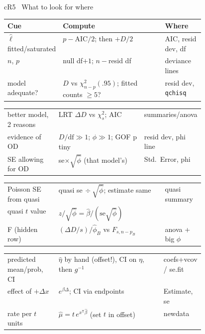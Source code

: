 \documentclass{article}
\newcommand{\tsp}{^{\mathsf T}}
\newcommand{\rc}[1]{\texttt{#1}}
\begin{document}
\begin{multicols*}{3}
\begin{tb}{cR}{5 \textbullet\ What to look for where}
\begin{tabularx}{\linewidth}{@{}>{\raggedright\arraybackslash}p{0.26\linewidth}|L|>{\raggedright\arraybackslash}p{0.2\linewidth}@{}}
\textbf{Cue} & \textbf{Compute} & \textbf{Where}\\\hline
$\hat\ell$ fitted/saturated & $p-\text{AIC}/2$; then $+D/2$ & AIC, resid dev, df\\
$n$, $p$ & null df$+1$; $n-$resid df & deviance lines\\
model adequate? & $D$ vs $\chi^2_{n-p}(.95)$; fitted counts $\ge5$? & resid dev, \rc{qchisq}\\
\end{tabularx}\par\nointerlineskip
\begin{tabularx}{\linewidth}{@{}>{\raggedright\arraybackslash}p{0.26\linewidth}|L|>{\raggedright\arraybackslash}p{0.2\linewidth}@{}}
better model, 2 reasons & LRT $\Delta D$ vs $\chi^2_s$; AIC & 2 summaries/anova\\
evidence of OD & $D/\text{df}\gg1$; $\hat\phi\gg1$; GOF p tiny & resid dev, phi line\\
SE allowing for OD & se$\times\sqrt{\hat\phi}$ (that model's) & Std.\ Error, phi\\
\end{tabularx}\par\nointerlineskip
\begin{tabularx}{\linewidth}{@{}>{\raggedright\arraybackslash}p{0.26\linewidth}|L|>{\raggedright\arraybackslash}p{0.2\linewidth}@{}}
Poisson SE from quasi & quasi se$\,\div\sqrt{\hat\phi}$; estimate same & quasi summary\\
quasi $t$ value & $z/\sqrt{\hat\phi}=\hat\beta/(\text{se}\sqrt{\hat\phi})$ & \\
F (hidden row) & $(\Delta D/s)/\hat\phi_B$ vs $F_{s,n-p_B}$ & anova + big $\hat\phi$\\
\end{tabularx}\par\nointerlineskip
\begin{tabularx}{\linewidth}{@{}>{\raggedright\arraybackslash}p{0.26\linewidth}|L|>{\raggedright\arraybackslash}p{0.2\linewidth}@{}}
predicted mean/prob, CI & $\hat\eta$ by hand (offset!), CI on $\eta$, then $g^{-1}$ & coefs+vcov / se.fit\\
effect of $+\Delta x$ & $e^{\beta\Delta}$; CI via endpoints & Estimate, se\\
rate per $t$ units & $\hat\mu=t\,e^{x\tsp\hat\beta}$ (set $t$ in offset) & newdata\\
\end{tabularx}
\end{tb}


\end{multicols*}
\end{document}
